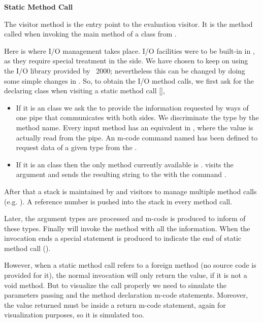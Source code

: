 {\bf{Static Method Call}}

The visitor method  is the entry point to the evaluation visitor. It is the method called when invoking the main method of a class from .

Here is where I/O management takes place. I/O facilities were to be built-in in \djava{}, as they require special treatment in the \jel{} side. We have chosen to keep on using the I/O library provided by \jel{}~2000; nevertheless this can be changed by doing some simple changes in . So, to obtain the I/O method calls, we first ask for the declaring class when
visiting a static method call [],

\begin{itemize}

	\item If it is an  class we ask the  to provide the information requested by ways of one pipe that communicates with both sides. We discriminate the type by the method name. Every input method has an equivalent in , where the value is actually read from the pipe. An m-code command named  has been defined to request data of a given type from the .

\item If it is an  class then the only method currently available is . \djava{} visits the argument and sends the resulting string to the  with the command
.

\end{itemize}

After that a stack is maintained by  and  visitors to manage multiple method calls (e.g. ). A reference number is pushed into the stack in every method call.

Later, the argument types are processed and m-code is produced to inform  of these types. Finally \djava{} will invoke the method with all the information. When the invocation ends a special statement is produced to indicate the end of static method call ().

However, when a static method call refers to a foreign method (no source code is provided for it), the normal invocation will only return the value, if it is not a void method. But to visualize the call properly we need to simulate the parameters passing and the method declaration m-code statements. Moreover, the value returned must be inside a return m-code statement, again for visualization purposes, so it is simulated too.

